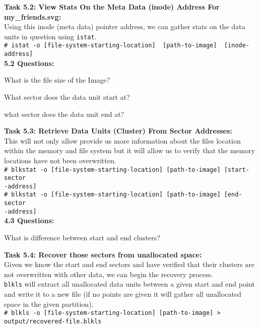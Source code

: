 \documentclass[a4paper,11pt]{article}
\begin{document}
{\noindent
\textbf{Task 5.2: View Stats On the Meta Data (inode) Address For my\_friends.svg:}\\
Using this inode (meta data) pointer address, we can gather stats on the data units in question using \texttt{istat}.\\
\verb|# istat -o [file-system-starting-location]  [path-to-image]  [inode-address]|\\

\noindent
\textbf{5.2 Questions:}
\begin{enumerate*}
	\item What is the file size of the Image?
	\item What sector does the data unit start at?
	\item what sector does the data unit end at?\\
\end{enumerate*}	
}
{\noindent
\textbf{Task 5.3: Retrieve Data Units (Cluster) From Sector Addresses:}\\
This will not only allow provide us more information about the files location within the memory and file system but it will allow us to verify that the memory locations have not been overwritten.\\
\texttt{{\#} blkstat -o [file-system-starting-location]  [path-to-image]  [start-sector\\-address]}\\
\noindent
\texttt{{\#} blkstat -o [file-system-starting-location]  [path-to-image]  [end-sector\\-address]}\\

\noindent
\textbf{4.3 Questions:}
\begin{enumerate*}
	\item What is difference between start and end clusters?\\
\end{enumerate*}	
}
{\noindent
\textbf{Task 5.4: Recover those sectors from unallocated space:}\\
Given we know the start and end sectors and have verified that their clusters are not overwritten with other data, we can begin the recovery process.\\

\texttt{blkls} will extract all unallocated data units between a given start and end point and write it to a new file (if no points are given it will gather all unallocated space in the given partition). \\

\noindent
\texttt{{\#} blkls -o [file-system-starting-location]  [path-to-image] > \\output/recovered-file.blkls}
}\\
\end{document}
